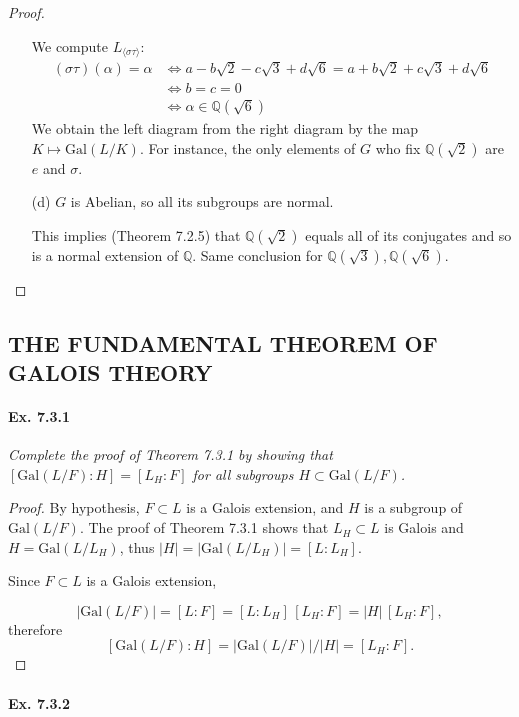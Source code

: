 \documentclass[11pt,a4paper]{article}
\newcommand{\Q}{\mathbb{Q}}
\newcommand{\Gal}{\mathrm{Gal}}
\begin{document}
\begin{proof}
\begin{enumerate}
We compute $L_{\langle \sigma \tau \rangle}$:
\begin{align*}
(\sigma\tau)(\alpha) = \alpha &\iff a-b\sqrt{2} - c\sqrt{3}+d \sqrt{6} = a+b\sqrt{2} + c\sqrt{3}+d \sqrt{6}\\
&\iff b=c=0\\
&\iff \alpha \in \Q(\sqrt{6})
\end{align*}
We obtain the left diagram from the right diagram by the map $K \mapsto \Gal(L/K)$. For instance, the only elements of $G$ who fix $\Q(\sqrt{2})$ are $e$ and $\sigma$.

\item[(d)]
$G$ is Abelian, so all its subgroups are normal.

This implies (Theorem 7.2.5) that $\Q(\sqrt{2})$ equals all of its conjugates and so is a normal extension of $\Q$.  Same conclusion for $\Q(\sqrt{3}),\Q(\sqrt{6})$. 

\end{enumerate}
\end{proof}

\subsection{THE FUNDAMENTAL THEOREM OF GALOIS THEORY}

\paragraph{Ex. 7.3.1}

{\it Complete the proof of Theorem 7.3.1 by showing that $[\Gal(L/F) : H] = [L_H:F]$ for all subgroups $H \subset \Gal(L/F)$.
}

\begin{proof}
By hypothesis, $F \subset L$ is a Galois extension, and $H$ is a subgroup of $\Gal(L/F)$.
The proof of Theorem 7.3.1 shows that $L_H \subset L$ is Galois and  $H=\Gal(L/L_H)$, thus $\vert H \vert =|\Gal(L/L_H)| =  [L:L_H]$.

Since $F \subset L$ is a Galois extension, 

$$\vert \Gal(L/F) \vert =[L:F] = [L:L_H]\,[L_H:F] = \vert H \vert\, [L_H:F], $$
therefore
$$[\Gal(L/F):H] = \vert \Gal(L/F) \vert / \vert H \vert = [L_H:F].$$
\end{proof}

\paragraph{Ex. 7.3.2}
\end{document}
